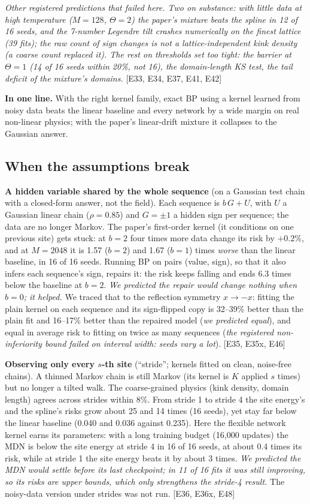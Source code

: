 \documentclass[11pt,a4paper]{article}
\newcommand{\key}[1]{\par\smallskip\noindent\colorbox{soft}{\parbox{\dimexpr\linewidth-2\fboxsep}{\small\textbf{In one line.} #1}}\par\smallskip}
\newcommand{\src}[1]{{\footnotesize\color{gray}[#1]}}
\newcommand{\fals}[1]{{\small\itshape #1}}
\begin{document}
\fals{Other registered predictions that failed here. Two on substance: with little data at high temperature ($M=128$, $\Theta=2$)
the paper's mixture beats the spline in 12 of 16 seeds, and the 7-number Legendre tilt crashes numerically on the finest lattice
(39 fits); the raw count of sign changes is not a lattice-independent kink density (a coarse count replaced it). The rest on
thresholds set too tight: the barrier at $\Theta=1$ (14 of 16 seeds within 20\%, not 16), the domain-length KS test, the tail
deficit of the mixture's domains.}
\src{E33, E34, E37, E41, E42}

\key{With the right kernel family, exact BP using a kernel learned from noisy data beats the linear baseline and every network by a
wide margin on real non-linear physics; with the paper's linear-drift mixture it collapses to the Gaussian answer.}

\subsection{When the assumptions break}

\textbf{A hidden variable shared by the whole sequence} (on a Gaussian test chain with a closed-form answer, not the field). Each
sequence is $b\,G+U$, with $U$ a Gaussian linear chain ($\rho=0.85$) and $G=\pm1$ a hidden sign per sequence; the data are no longer Markov. The paper's
first-order kernel (it conditions on one previous site) gets stuck: at $b=2$ four times more data change its risk by $+0.2\%$, and at
$M=2048$ it is 1.57 ($b=2$) and 1.67 ($b=1$) times \emph{worse} than the linear baseline, in 16 of 16 seeds. Running BP on pairs
(value, sign), so that it also infers each sequence's sign, repairs it: the risk keeps falling and ends 6.3 times below the baseline at
$b=2$. \fals{We predicted the repair would change nothing when $b=0$; it helped.} We traced that to the reflection symmetry $x\to-x$:
fitting the plain kernel on each sequence and its sign-flipped copy is 32--39\% better than the plain fit and 16--17\% better than
the repaired model (\fals{we predicted equal}), and equal in average risk to fitting on twice as many sequences (\fals{the registered
non-inferiority bound failed on interval width: seeds vary a lot}). \src{E35, E35x, E46}

\textbf{Observing only every $s$-th site} (``stride''; kernels fitted on clean, noise-free chains). A thinned Markov chain is still
Markov (its kernel is $K$ applied $s$ times) but no longer a tilted walk. The coarse-grained physics (kink density, domain length)
agrees across strides within 8\%. From stride 1 to stride 4 the site energy's and the spline's risks grow about 25 and 14 times
(16 seeds), yet stay far below the linear baseline (0.040 and 0.036 against 0.235). Here the flexible network kernel earns its
parameters: with a long training budget (16,000 updates) the MDN is below the site energy at stride 4 in 16 of 16 seeds, at about
0.4 times its risk, while at stride 1 the site energy beats it by about 3 times. \fals{We predicted the MDN would settle before its
last checkpoint; in 11 of 16 fits it was still improving, so its risks are upper bounds, which only strengthens the stride-4 result.}
The noisy-data version under strides was not run. \src{E36, E36x, E48}
\end{document}
